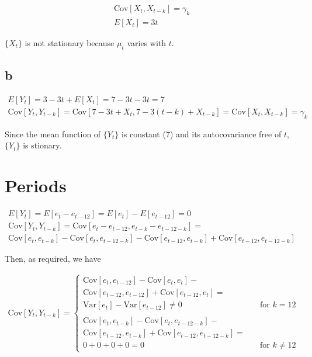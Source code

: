 \documentclass[]{book}
\begin{document}
\begin{gather*}
  \text{Cov}[X_t, X_{t-k}] = \gamma_k\\
  E[X_t] = 3t
\end{gather*}

\(\{X_t\}\) is not stationary because \(\mu_t\) varies with \(t\).

\subsection*{b}\label{b-8}

\begin{gather*}
  E[Y_t] = 3 - 3t+E[X_t] = 7 - 3t - 3t = 7\\
  \text{Cov}[Y_t, Y_{t-k}] = \text{Cov}[7-3t+X_t,7-3(t-k)+X_{t-k}] = \text{Cov}[X_t, X_{t-k}] = \gamma_k
\end{gather*}

Since the mean function of \(\{Y_t\}\) is constant (7) and its
autocovariance free of \(t\), \(\{Y_t\}\) is stionary.

\section{Periods}\label{periods}

\begin{gather*}
  E[Y_t] = E[e_t - e_{t-12}] = E[e_t] - E[e_{t-12}] = 0\\
  \text{Cov}[Y_t, Y_{t-k}] = \text{Cov}[e_t - e_{t-12}, e_{t-k} - e_{t-12-k}] =\\
  \text{Cov}[e_t, e_{t-k}] - \text{Cov}[e_t, e_{t-12-k}] - \text{Cov}[e_{t-12}, e_{t-k}] + \text{Cov}[e_{t-12}, e_{t-12-k}]
\end{gather*}

Then, as required, we have

\begin{gather*} \text{Cov}[Y_t, Y_{t-k}] =
  \begin{cases}
    \text{Cov}[e_t, e_{t-12}] - \text{Cov}[e_t, e_t] -\\ \text{Cov}[e_{t-12}, e_{t-12}] + \text{Cov}[e_{t-12},e_t] =\\
      \text{Var}[e_t] - \text{Var}[e_{t-12}] \neq 0 & \quad \text{for }  k=12\\
      \\
    \text{Cov}[e_t, e_{t-k}] - \text{Cov}[e_t, e_{t-12-k}] -\\ \text{Cov}[e_{t-12}, e_{t-k}] + \text{Cov}[e_{t-12}, e_{t-12-k}] =\\
    0 + 0 + 0 + 0 = 0 & \quad \text{for } k \neq 12
  \end{cases}
\end{gather*}
\end{document}
